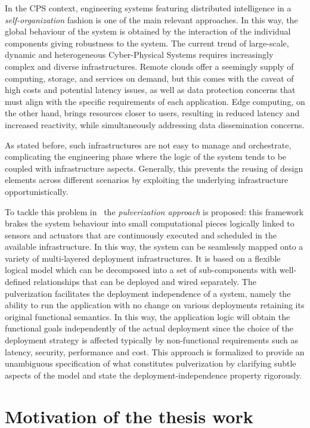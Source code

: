 In the CPS context, engineering systems featuring distributed intelligence in a \emph{self-organization} fashion is one of the main relevant
approaches. In this way, the global behaviour of the system is obtained by the interaction of the individual components giving robustness to the
system. The current trend of large-scale, dynamic and heterogeneous Cyber-Physical Systems requires increasingly complex and diverse
infrastructures. Remote clouds offer a seemingly supply of computing, storage, and services on demand, but this comes with the caveat of high
costs and potential latency issues, as well as data protection concerns that must align with the specific requirements of each application. Edge
computing, on the other hand, brings resources closer to users, resulting in reduced latency and increased reactivity, while simultaneously
addressing data dissemination concerns.

As stated before, such infrastructures are not easy to manage and orchestrate, complicating the engineering phase where the logic of the
system tends to be coupled with infrastructure aspects. Generally, this prevents the reusing of design elements across different scenarios by
exploiting the underlying infrastructure opportunistically.

To tackle this problem in~\cite{DBLP:journals/fi/CasadeiPPVW20} the \emph{pulverization approach} is proposed: this framework brakes the system
behaviour into small computational pieces logically linked to sensors and actuators that are continuously executed and scheduled in the available
infrastructure.
In this way, the system can be seamlessly mapped onto a variety of multi-layered deployment infrastructures.
It is based on a flexible logical model which can be decomposed into a set of sub-components with well-defined relationships that can be deployed and
wired separately. The pulverization facilitates the deployment independence of a system, namely the ability to run the application with no change
on various deployments retaining its original functional semantics.
In this way, the application logic will obtain the functional goals independently of the actual deployment since the choice of the deployment
strategy is affected typically by non-functional requirements such as latency, security, performance and cost.
This approach is formalized to provide an unambiguous specification of what constitutes pulverization by clarifying subtle aspects of the model
and state the deployment-independence property rigorously.

\section{Motivation of the thesis work}

